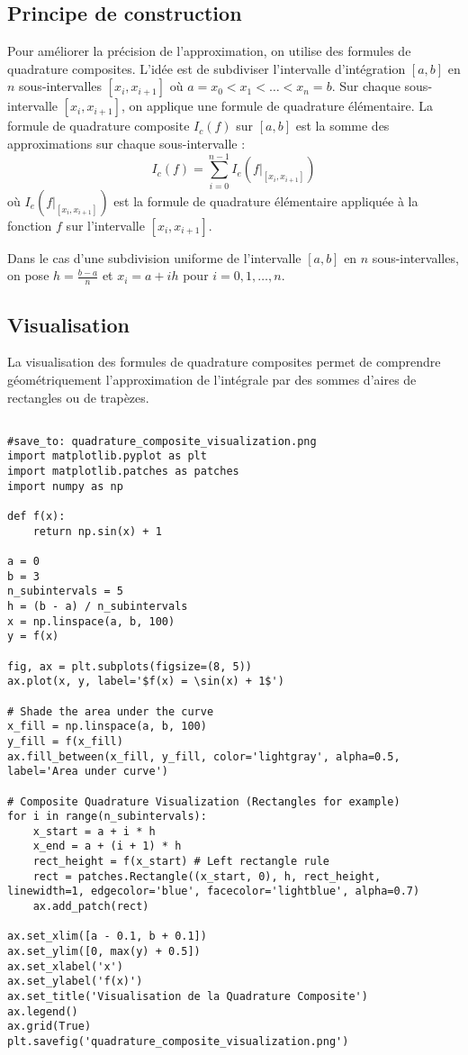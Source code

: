 \documentclass{article}
\begin{document}
\subsection{Principe de construction}

Pour améliorer la précision de l'approximation, on utilise des formules de quadrature composites. L'idée est de subdiviser l'intervalle d'intégration $[a, b]$ en $n$ sous-intervalles $[x_i, x_{i+1}]$ où $a = x_0 < x_1 < \dots < x_n = b$. Sur chaque sous-intervalle $[x_i, x_{i+1}]$, on applique une formule de quadrature élémentaire. La formule de quadrature composite $I_c(f)$ sur $[a, b]$ est la somme des approximations sur chaque sous-intervalle :
\[ I_c(f) = \sum_{i=0}^{n-1} I_e(f|_{[x_i, x_{i+1}]}) \]
où $I_e(f|_{[x_i, x_{i+1}]})$ est la formule de quadrature élémentaire appliquée à la fonction $f$ sur l'intervalle $[x_i, x_{i+1}]$.

Dans le cas d'une subdivision uniforme de l'intervalle $[a, b]$ en $n$ sous-intervalles, on pose $h = \frac{b-a}{n}$ et $x_i = a + ih$ pour $i = 0, 1, \dots, n$.

\subsection{Visualisation}

La visualisation des formules de quadrature composites permet de comprendre géométriquement l'approximation de l'intégrale par des sommes d'aires de rectangles ou de trapèzes.

\begin{verbatim}

#save_to: quadrature_composite_visualization.png
import matplotlib.pyplot as plt
import matplotlib.patches as patches
import numpy as np

def f(x):
    return np.sin(x) + 1

a = 0
b = 3
n_subintervals = 5
h = (b - a) / n_subintervals
x = np.linspace(a, b, 100)
y = f(x)

fig, ax = plt.subplots(figsize=(8, 5))
ax.plot(x, y, label='$f(x) = \sin(x) + 1$')

# Shade the area under the curve
x_fill = np.linspace(a, b, 100)
y_fill = f(x_fill)
ax.fill_between(x_fill, y_fill, color='lightgray', alpha=0.5, label='Area under curve')

# Composite Quadrature Visualization (Rectangles for example)
for i in range(n_subintervals):
    x_start = a + i * h
    x_end = a + (i + 1) * h
    rect_height = f(x_start) # Left rectangle rule
    rect = patches.Rectangle((x_start, 0), h, rect_height, linewidth=1, edgecolor='blue', facecolor='lightblue', alpha=0.7)
    ax.add_patch(rect)

ax.set_xlim([a - 0.1, b + 0.1])
ax.set_ylim([0, max(y) + 0.5])
ax.set_xlabel('x')
ax.set_ylabel('f(x)')
ax.set_title('Visualisation de la Quadrature Composite')
ax.legend()
ax.grid(True)
plt.savefig('quadrature_composite_visualization.png')

\end{verbatim}
\end{document}
